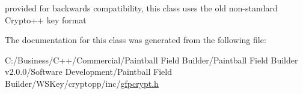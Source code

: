 provided for backwards compatibility, this class uses the old non-\/standard Crypto++ key format 

The documentation for this class was generated from the following file:\begin{DoxyCompactItemize}
\item 
C:/Business/C++/Commercial/Paintball Field Builder/Paintball Field Builder v2.0.0/Software Development/Paintball Field Builder/WSKey/cryptopp/inc/\hyperlink{gfpcrypt_8h}{gfpcrypt.h}\end{DoxyCompactItemize}
